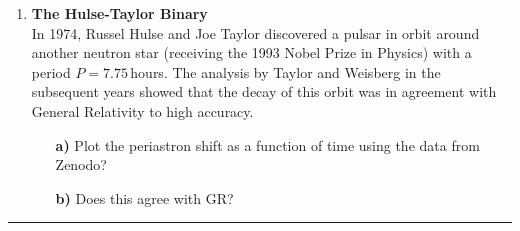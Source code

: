 \documentclass[11pt]{article}
\begin{document}
\begin{enumerate}
\begin{itemize}
\end{itemize}


\item
{\bf The Hulse-Taylor Binary} \\
In 1974, Russel Hulse and Joe Taylor discovered a pulsar in orbit
around another neutron star (receiving the 1993 Nobel Prize in
Physics) with a period $P = 7.75$\,hours. The analysis by Taylor and Weisberg in
the subsequent years showed that the decay of this orbit was in
agreement with General Relativity to high accuracy.
\begin{itemize}

\item[\bf a)] Plot the periastron shift as a function of time using
  the data from Zenodo?

\item[\bf b)] Does this agree with GR?

\end{itemize}
\end{enumerate}

\bigskip
{\color{Sepia} \hrule}
\end{document}
